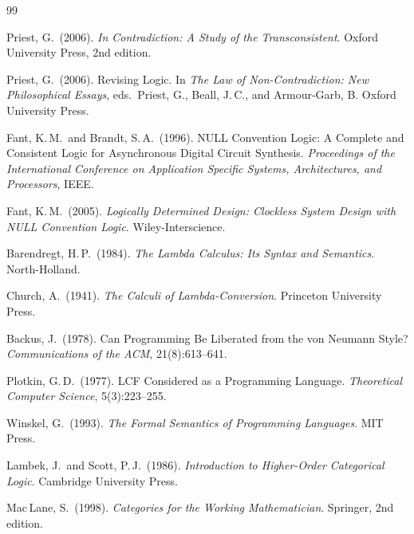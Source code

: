 \documentclass[12pt, oneside]{amsbook}
\theoremstyle{plain}
\theoremstyle{definition}
\theoremstyle{remark}
\begin{document}

\begin{thebibliography}{99}


Priest, G.\ (2006).
\textit{In Contradiction: A Study of the Transconsistent}.
Oxford University Press, 2nd edition.

Priest, G.\ (2006).
Revising Logic.
In \textit{The Law of Non-Contradiction: New Philosophical Essays},
eds.\ Priest, G., Beall, J.\,C., and Armour-Garb, B.
Oxford University Press.


Fant, K.\,M.\ and Brandt, S.\,A.\ (1996).
NULL Convention Logic: A Complete and Consistent Logic for Asynchronous
Digital Circuit Synthesis.
\textit{Proceedings of the International Conference on Application Specific
Systems, Architectures, and Processors}, IEEE.

Fant, K.\,M.\ (2005).
\textit{Logically Determined Design: Clockless System Design with NULL
Convention Logic}.
Wiley-Interscience.


Barendregt, H.\,P.\ (1984).
\textit{The Lambda Calculus: Its Syntax and Semantics}.
North-Holland.

Church, A.\ (1941).
\textit{The Calculi of Lambda-Conversion}.
Princeton University Press.

Backus, J.\ (1978).
Can Programming Be Liberated from the von Neumann Style?
\textit{Communications of the ACM}, 21(8):613--641.

Plotkin, G.\,D.\ (1977).
LCF Considered as a Programming Language.
\textit{Theoretical Computer Science}, 5(3):223--255.

Winskel, G.\ (1993).
\textit{The Formal Semantics of Programming Languages}.
MIT Press.


Lambek, J.\ and Scott, P.\,J.\ (1986).
\textit{Introduction to Higher-Order Categorical Logic}.
Cambridge University Press.

Mac\,Lane, S.\ (1998).
\textit{Categories for the Working Mathematician}.
Springer, 2nd edition.


\end{thebibliography}
\end{document}
